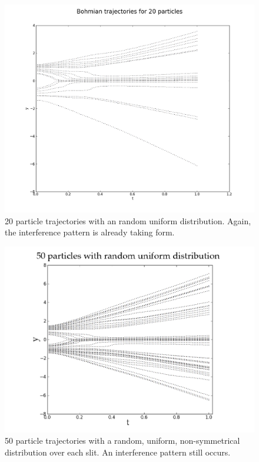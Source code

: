 \documentclass[10pt, reqno]{article}
\begin{document}
  \begin{figure}[!ht]
    \centerline{\includegraphics[scale=.3]{./imgs/20-particles-uniform-3.png}}
    \caption{
      20 particle trajectories with an random uniform distribution.
      Again, the interference pattern is already taking form.
    }
    \label{fig:trajnonsym}
  \end{figure}

  \begin{figure}[!ht]
    \centerline{\includegraphics[scale=.5]{./imgs/50-particles-uniform.png}}
    \caption{
      50 particle trajectories with a random, uniform, non-symmetrical distribution over each slit.
      An interference pattern still occurs.
    }
    \label{fig:trajnorm}
  \end{figure}
  \nocite{philippidis}
\end{document}
